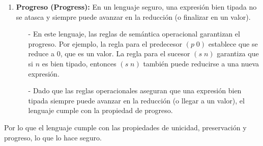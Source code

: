 \documentclass{article}
\begin{document}
\begin{enumerate}
\begin{enumerate}
\begin{enumerate}
                \item \textbf{Progreso (Progress):} En un lenguaje seguro, una expresión bien tipada no se atasca y siempre puede avanzar en la reducción (o finalizar en un valor).
                \begin{itemize}
                    \item[-] En este lenguaje, las reglas de semántica operacional garantizan el progreso. Por ejemplo, la regla para el predecesor $(p\;0)$ establece que se reduce a $0$, que es un valor. La regla para el sucesor $(s\;n)$ garantiza que si $n$ es bien tipado, entonces $(s\;n)$ también puede reducirse a una nueva expresión.

                    \item[-]Dado que las reglas operacionales aseguran que una expresión bien tipada siempre puede avanzar en la reducción (o llegar a un valor), el lenguaje cumple con la propiedad de progreso.
                \end{itemize}
            \end{enumerate}
            Por lo que el lenguaje cumple con las propiedades de unicidad, preservación y progreso, lo que lo hace seguro.
        \end{enumerate}
    \end{enumerate}
\end{document}
